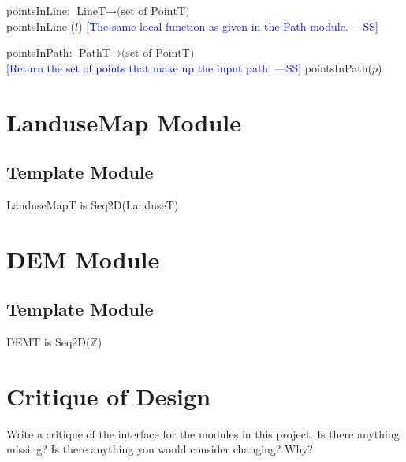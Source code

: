 \documentclass[12pt]{article}
\newcommand{\authornote}[3]{\textcolor{#1}{[#3 ---#2]}}
\newcommand{\authornote}[3]{}
\newcommand{\wss}[1]{\authornote{blue}{SS}{#1}}
\begin{document}
\noindent pointsInLine: $\mbox{LineT} \rightarrow \mbox{(set of PointT)}$\\
\noindent pointsInLine ($l$) 
\wss{The same local function as given in the Path module.}

\noindent pointsInPath: $\mbox{PathT} \rightarrow \mbox{(set of PointT)}$\\
\wss{Return the set of points that make up the input path.}
\noindent pointsInPath($p$) 

\newpage

\section* {LanduseMap Module}

\subsection* {Template Module}

LanduseMapT is Seq2D(LanduseT)

\section* {DEM Module}

\subsection* {Template Module}

DEMT is Seq2D($\mathbb{Z}$)

\newpage

\section*{Critique of Design}

Write a critique of the interface for the modules in this project.  Is there
anything missing?  Is there anything you would consider changing?  Why?
\end{document}
